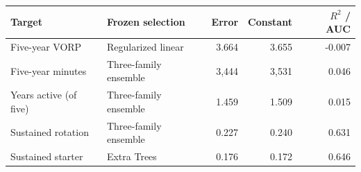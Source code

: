\begin{tabular}{llrrr}
\toprule
Target & Frozen selection & Error & Constant & $R^2$ / AUC \\
\midrule
Five-year VORP & Regularized linear & 3.664 & 3.655 & -0.007 \\
Five-year minutes & Three-family ensemble & 3,444 & 3,531 & 0.046 \\
Years active (of five) & Three-family ensemble & 1.459 & 1.509 & 0.015 \\
Sustained rotation & Three-family ensemble & 0.227 & 0.240 & 0.631 \\
Sustained starter & Extra Trees & 0.176 & 0.172 & 0.646 \\
\bottomrule
\end{tabular}
